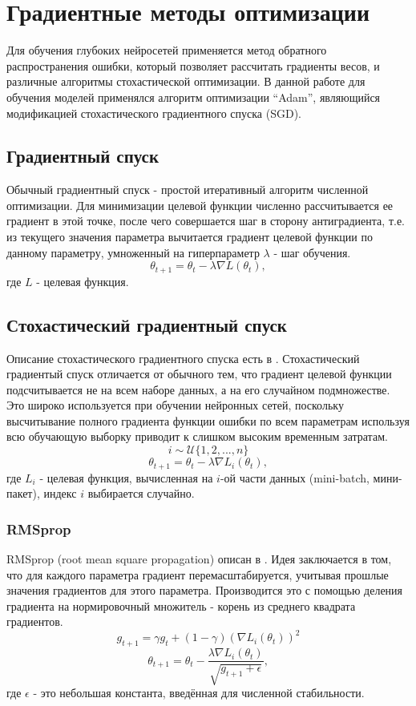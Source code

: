 \clearpage
\section{Градиентные методы оптимизации}
	Для обучения глубоких нейросетей применяется метод обратного распространения ошибки, который позволяет рассчитать градиенты весов, и различные алгоритмы стохастической оптимизации. В данной работе для обучения моделей применялся алгоритм оптимизации ``Adam'', являющийся модификацией стохастического градиентного спуска (SGD).
	\subsection{Градиентный спуск}
		Обычный градиентный спуск - простой итеративный алгоритм численной оптимизации. Для минимизации целевой функции численно рассчитывается ее градиент в этой точке, после чего совершается шаг в сторону антиградиента, т.е. из текущего значения параметра вычитается градиент целевой функции по данному параметру, умноженный на гиперпараметр $\lambda$ - шаг обучения.
		$$ \theta_{t+1} = \theta_t - \lambda \nabla L(\theta_t), $$
		где $L$ - целевая функция.
	\subsection{Стохастический градиентный спуск}
		Описание стохастического градиентного спуска есть в \cite{Amari}. Стохастический градиентый спуск отличается от обычного тем, что градиент целевой функции подсчитывается не на всем наборе данных, а на его случайном подмножестве. Это широко используется при обучении нейронных сетей, поскольку высчитывание полного градиента функции ошибки по всем параметрам используя всю обучающую выборку приводит к слишком высоким временным затратам.
		$$ i \sim \mathcal{U}\{1, 2, ..., n\} $$
		$$ \theta_{t+1} = \theta_t - \lambda \nabla L_i(\theta_t), $$
		где $L_i$ - целевая функция, вычисленная на $i$-ой части данных (mini-batch, мини-пакет), индекс $i$ выбирается случайно.
		\subsubsection{RMSprop}
			RMSprop (root mean square propagation) описан в \cite{Hinton}. Идея заключается в том, что для каждого параметра градиент перемасштабируется, учитывая прошлые значения градиентов для этого параметра. Производится это с помощью деления градиента на нормировочный множитель - корень из среднего квадрата градиентов.
			$$ g_{t+1} = \gamma g_t + (1 - \gamma) (\nabla L_i(\theta_t))^2$$
			$$ \theta_{t+1} = \theta_t - \frac{\lambda \nabla L_i(\theta_t)}{\sqrt{g_{t+1} + \epsilon}}, $$
			где $\epsilon$ - это небольшая константа, введённая для численной стабильности.
